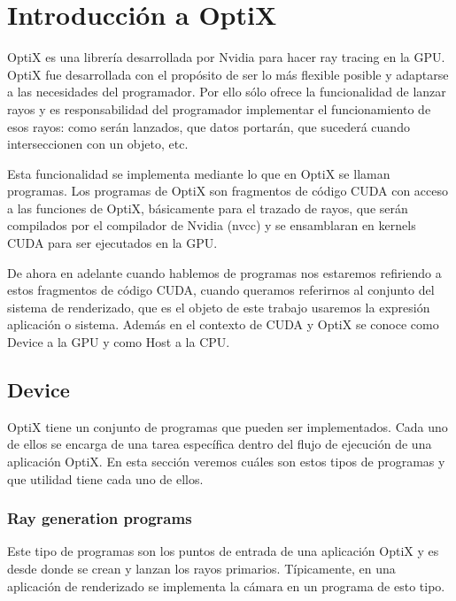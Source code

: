 \chapter{Introducción a OptiX}


OptiX es una librería desarrollada por Nvidia para hacer ray tracing en la GPU. OptiX fue desarrollada con el propósito de ser lo más flexible posible y adaptarse a las necesidades del programador. Por ello sólo ofrece la funcionalidad de lanzar rayos y es responsabilidad del programador implementar el funcionamiento de esos rayos: como serán lanzados, que datos portarán, que sucederá cuando interseccionen con un objeto, etc.

\medskip

Esta funcionalidad se implementa mediante lo que en OptiX se llaman programas. Los programas de OptiX son fragmentos de código CUDA con acceso a las funciones de OptiX, básicamente para el trazado de rayos, que serán compilados por el compilador de Nvidia (nvcc) y se ensamblaran en kernels CUDA para ser ejecutados en la GPU. 

\medskip
De ahora en adelante cuando hablemos de programas nos estaremos refiriendo a estos fragmentos de código CUDA, cuando queramos referirnos al conjunto del sistema de renderizado, que es el objeto de este trabajo usaremos la expresión aplicación o sistema. Además en el contexto de CUDA y OptiX se conoce como Device a la GPU y como Host a la CPU.

\clearpage

\section{Device}

OptiX tiene un conjunto de programas que pueden ser implementados. Cada uno de ellos se encarga de una tarea específica dentro del flujo de ejecución de una aplicación OptiX. En esta sección veremos cuáles son estos tipos de programas y que utilidad tiene cada uno de ellos.  

\subsection{Ray generation programs}

Este tipo de programas son los puntos de entrada de una aplicación OptiX y es desde donde se crean y lanzan los rayos primarios. Típicamente, en una aplicación de renderizado se implementa la cámara en un programa de esto tipo.

